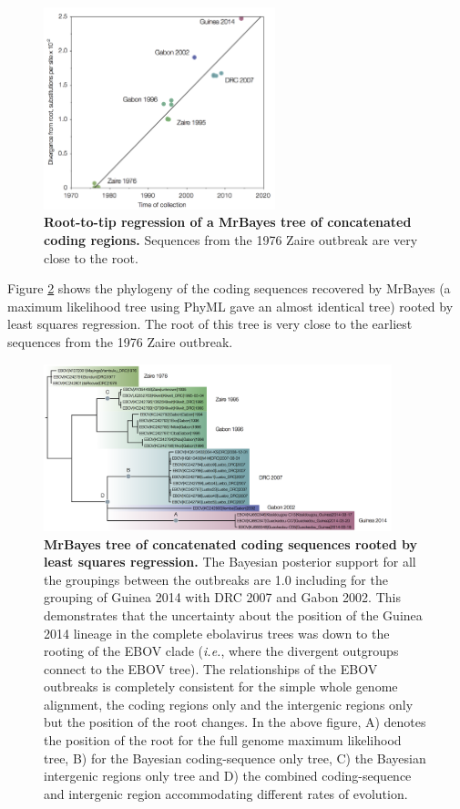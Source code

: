 \documentclass[11pt,oneside,letterpaper]{article}
\begin{document}
\begin{figure}[h!]
\centering  
\includegraphics[width=0.6\textwidth]  {figures/EBOV_cds_mb_path.png}
\caption{\textbf{Root-to-tip regression of a MrBayes tree of concatenated coding regions.}
Sequences from the 1976 Zaire outbreak are very close to the root.}
\label{MBPath}
\end{figure}

Figure \ref{MBtreePath} shows the phylogeny of the coding sequences recovered by MrBayes (a maximum likelihood tree using PhyML gave an almost identical tree) rooted by least squares regression.
The root of this tree is very close to the earliest sequences from the 1976 Zaire outbreak.

\begin{figure}[h!]
\centering  
\includegraphics[width=0.9\textwidth]  {figures/EBOV_cds_mb_rootedTree.png}
\caption{\textbf{MrBayes tree of concatenated coding sequences rooted by least squares regression.}
The Bayesian posterior support for all the groupings between the outbreaks are 1.0 including for the grouping of Guinea 2014 with DRC 2007 and Gabon 2002. This demonstrates that the uncertainty about the position of the Guinea 2014 lineage in the complete ebolavirus trees was down to the rooting of the EBOV clade (\textit{i.e.}, where the divergent outgroups connect to the EBOV tree). The relationships of the EBOV outbreaks is completely consistent for the simple whole genome alignment, the coding regions only and the intergenic regions only but the position of the root changes. In the above figure, A) denotes the position of the root for the full genome maximum likelihood tree, B) for the Bayesian coding-sequence only tree, C) the Bayesian intergenic regions only tree and D) the combined coding-sequence and intergenic region accommodating different rates of evolution.}
\label{MBtreePath}
\end{figure}
\end{document}

